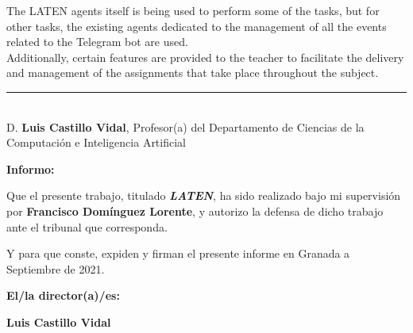 	The LATEN agents itself is being used to perform some of the tasks, but for other tasks, the existing agents dedicated to the management of all the events related to the Telegram bot are used.\\
	
	Additionally, certain features are provided to the teacher to facilitate the delivery and management of the assignments that take place throughout the subject.

\cleardoublepage

\thispagestyle{empty}

\noindent\rule[-1ex]{\textwidth}{2pt}\\[4.5ex]

D. \textbf{Luis Castillo Vidal}, Profesor(a) del Departamento de Ciencias de la Computación e Inteligencia Artificial

\vspace{0.5cm}

\textbf{Informo:}

\vspace{0.5cm}

Que el presente trabajo, titulado \textit{\textbf{LATEN}},
ha sido realizado bajo mi supervisión por \textbf{Francisco Domínguez Lorente}, y autorizo la defensa de dicho trabajo ante el tribunal
que corresponda.

\vspace{0.5cm}

Y para que conste, expiden y firman el presente informe en Granada a Septiembre de 2021.

\vspace{1cm}

\textbf{El/la director(a)/es: }

\vspace{5cm}

\noindent \textbf{Luis Castillo Vidal}